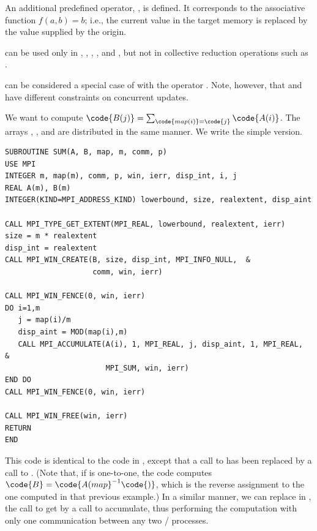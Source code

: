 An additional predefined operator, , is defined.
It corresponds to the associative function $f(a,b) = b$; i.e., the current
value in the target memory is replaced by the value supplied by the
origin.


 can be used only in ,
,
  , , and
  , but not in collective
reduction operations such as .

\begin{users}
 can be considered a special case of 
with the  operator .
Note, however, that  and 
have different constraints on concurrent updates.
\end{users}

\begin{example}
\label{ex:1sided-sum}
%
We want to compute $\code{B(j)} = \sum_{\code{\scriptsize{}map(i)} = \code{\scriptsize{}j}} \code{A(i)}$.
The arrays
, , and  are
distributed in the same manner.  We write
the simple version.

\begin{lstlisting}[language={[MPI]Fortran}]
SUBROUTINE SUM(A, B, map, m, comm, p)
USE MPI
INTEGER m, map(m), comm, p, win, ierr, disp_int, i, j
REAL A(m), B(m)
INTEGER(KIND=MPI_ADDRESS_KIND) lowerbound, size, realextent, disp_aint

CALL MPI_TYPE_GET_EXTENT(MPI_REAL, lowerbound, realextent, ierr)
size = m * realextent
disp_int = realextent
CALL MPI_WIN_CREATE(B, size, disp_int, MPI_INFO_NULL,  &
                    comm, win, ierr)

CALL MPI_WIN_FENCE(0, win, ierr)
DO i=1,m
   j = map(i)/m
   disp_aint = MOD(map(i),m)
   CALL MPI_ACCUMULATE(A(i), 1, MPI_REAL, j, disp_aint, 1, MPI_REAL,   &
                       MPI_SUM, win, ierr)
END DO
CALL MPI_WIN_FENCE(0, win, ierr)

CALL MPI_WIN_FREE(win, ierr)
RETURN
END
\end{lstlisting}

This code is identical to the code in
,
except that a call to  has been
replaced by a call to .  (Note that, if  is
one-to-one, the code computes $\code{B} =
\code{A(map}^{-1}\code{)}$, which is the 
reverse assignment to the one computed in that previous example.)
In a similar manner, we can replace
in ,
the call to get by a call to accumulate,
thus
performing the computation with only one communication between any
two \mpi/ processes.
\end{example}

